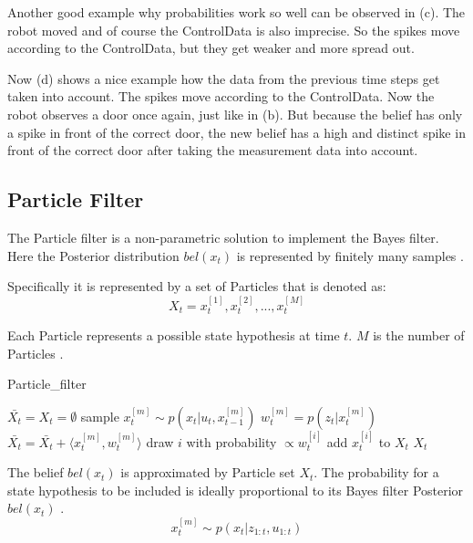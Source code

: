 Another good example why probabilities work so well can be observed in (c). The robot moved and of course the \gls{ControlData} is also imprecise. So the spikes move according to the \gls{ControlData}, but they get weaker and more spread out.

Now (d) shows a nice example how the data from the previous time steps get taken into account. The spikes move according to the \gls{ControlData}. Now the robot observes a door once again, just like in (b). But because the belief has only a spike in front of the correct door, the new belief has a high and distinct spike in front of the correct door after taking the measurement data into account.
\subsection{Particle Filter}
The \gls{Particle} filter is a non-parametric solution to implement the Bayes filter.  Here the \gls{Posterior} distribution $bel(x_t)$ is represented by finitely many samples \citep[p.\ 85]{Thrun:2005:PR:1121596}.

Specifically it is represented by a set of \gls{Particle}s that is denoted as:
\begin{equation}
X_t = x_t^{[1]},x_t^{[2]},...,x_t^{[M]}
\end{equation}

Each \gls{Particle} represents a possible state hypothesis at time $t$. $M$ is the number of \gls{Particle}s \citep[p.\ 96-97]{Thrun:2005:PR:1121596}.

\begin{algorithm}
\caption{Particle\_filter \citep[p.\ 98]{Thrun:2005:PR:1121596}}
\label{particle_filter}
\begin{algorithmic}[1]
\State $\bar{X_t} = X_t = \emptyset$
\State sample $x_t^{[m]} \sim p(x_t|u_t,x_{t-1}^{[m]})$
\State $w_t^{[m]} = p(z_t|x_t^{[m]})$
\State $\bar{X_t} = \bar{X_t} + \langle x_t^{[m]},w_t^{[m]}\rangle$
\EndFor
{}
\State draw $i$ with probability $\propto w_t^{[i]}$
\State add $x_t^{[i]}$ to $X_t$
\EndFor
\State \Return $X_t$
\EndProcedure
\end{algorithmic}
\end{algorithm}

The belief $bel(x_t)$ is approximated by \gls{Particle} set $X_t$. The probability for a state hypothesis to be included is ideally proportional to its Bayes filter \gls{Posterior} $bel(x_t)$ \citep[p.\ 98]{Thrun:2005:PR:1121596}.
\begin{equation} \label{eq:particle_prob}
x_t^{[m]} \sim p(x_t|z_{1:t},u_{1:t})
\end{equation}

